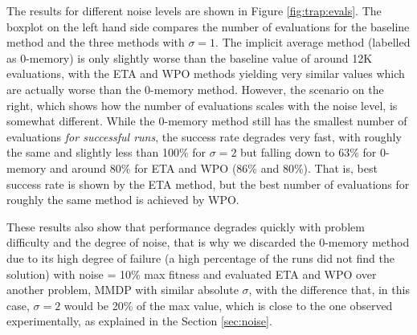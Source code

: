 \documentclass{llncs}
\begin{document}
The results for different noise levels are shown in Figure
\ref{fig:trap:evals}. The boxplot on the left hand side compares the
number of evaluations for the baseline method and the three methods
with  $\sigma=1$. The implicit average method (labelled as 0-memory) is
only slightly worse than the baseline value of around 12K evaluations,
with the ETA and WPO methods yielding very similar values which are
actually worse than the 0-memory method. However, the scenario on the
right,
 which shows how the number of evaluations scales with the noise
level, is somewhat different. While the 0-memory method still has the
smallest number of evaluations {\em for successful runs}, the success
rate degrades very fast, with roughly the same and slightly less than
100\% for $\sigma=2$ but falling down to 63\% for 0-memory and around
80\% for ETA and WPO (86\% and 80\%). That is, best success rate is
shown by the ETA method, but the best number of evaluations for
roughly the same method is achieved by WPO. 

These results also show that performance degrades quickly with problem
difficulty and the degree of noise, that is why we discarded the
0-memory method due to its high degree of failure (a high percentage of the runs did not find the solution) with noise = 10\%
max fitness and evaluated ETA and WPO over another problem, MMDP with
similar absolute $\sigma$, with the difference that, in this case,
$\sigma=2$ would be 20\% of the max value, which is close to the one
observed experimentally, as explained in the Section \ref{sec:noise}.
\end{document}
